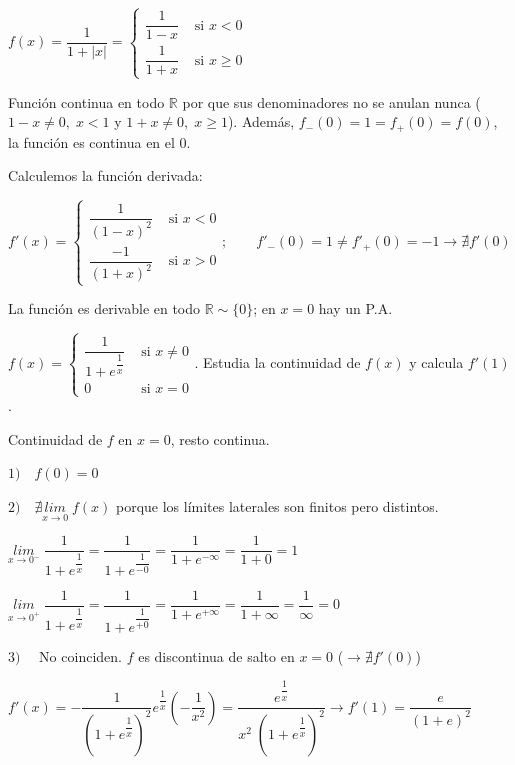 	\begin{proofw}\renewcommand{\qedsymbol}{$\diamond$}
	
	$f(x)=\dfrac 1 {1+|x|}=
	\begin{cases}
		\dfrac 1 {1-x} & \mbox{ si } x<0 \\
		\dfrac 1 {1+x} & \mbox{ si } x\ge0
	\end{cases}$
	
	Función continua en todo $\mathbb R$ por que sus denominadores no se anulan nunca ($1-x\neq 0, \; x<1$ y $1+x\neq 0, \; x\ge1$). Además, $f_-(0)=1=f_+(0)=f(0)$, la función es continua en el $0$.
	
	Calculemos la función derivada:
	
		$f'(x)=
		\begin{cases}
		\dfrac {1}{(1-x)^2} & \mbox{ si } x< 0 \\
		\dfrac {-1}{(1+x)^2}  & \mbox{ si } x >0  
		\end{cases} ; \qquad   f'_-(0)=1 \neq f'_+(0)=-1 \to \nexists f'(0)$	
		
	La función es derivable en todo $\mathbb R \sim \{0\}$; en $x=0$ hay un P.A.
	
	\end{proofw}
	
	\begin{ejre} $f(x)=\begin{cases}
	\dfrac {1}{1+e^{\dfrac 1 x}} & \mbox{ si } x \neq 0 \\
	0 & \mbox{ si } x=0
	\end{cases}$. Estudia la continuidad de $f(x)$ y calcula $f'(1)$.
		
	\end{ejre}
	
	\begin{proofw}\renewcommand{\qedsymbol}{$\diamond$}
	
	Continuidad de $f$ en $x=0$, resto continua.
	
	$1) \quad f(0)=0$
	
	$2) \quad \nexists \underset{x\to 0}{lim}\;{f(x)}$ porque los límites laterales son finitos pero distintos.
	
	$\underset{x\to 0^-}{lim}\;{\dfrac {1}{1+e^{\dfrac 1 x}}}=\dfrac {1}{1+e^{\dfrac 1 {-0}}}=\dfrac {1}{1+e^{-\infty}}=\dfrac {1}{1+0}=1$
	
	$\underset{x\to 0^+}{lim}\;{\dfrac {1}{1+e^{\dfrac 1 x}}}=\dfrac {1}{1+e^{\dfrac 1 {+0}}}=\dfrac {1}{1+e^{+\infty}}=\dfrac {1}{1+\infty}=\dfrac 1 \infty=0$
	
	$3) \quad $ No coinciden. $f$ es discontinua de salto en $x=0$ ($\to \nexists f'(0)$)
		
	$f'(x)= -\dfrac {1}{\left( 1+e^{\dfrac 1 x} \right)^2} e^{\dfrac 1 x} \left( -\dfrac 1 {x^2}\right)=\dfrac {e^{\dfrac 1 {x}}}{x^2\; \left( 1+e^{\dfrac 1 x} \right)^2} \to f'(1)=\dfrac e {(1+e)^2}$
		
	\end{proofw}
		

